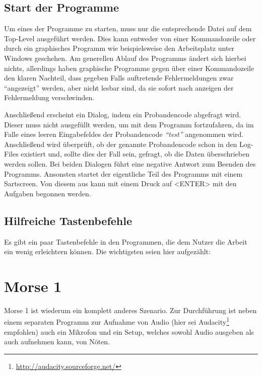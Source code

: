 \documentclass[a4paper]{scrartcl}
\newtheorem[M]{thmL}{Definition}
\begin{document}
\subsection{Start der Programme} \label{start}
Um eines der Programme zu starten, muss nur die entsprechende Datei auf dem Top-Level ausgeführt werden. Dies kann entweder von einer Kommandozeile oder durch ein graphisches Programm wie beispielsweise den Arbeitsplatz unter Windows geschehen. Am generellen Ablauf des Programms ändert sich hierbei nichts, allerdings haben graphische Programme gegen über einer Kommandozeile den klaren Nachteil, dass gegeben Falls auftretende Fehlermeldungen zwar "`angezeigt"' werden, aber nicht lesbar sind, da sie sofort nach anzeigen der Fehlermeldung verschwinden.

Anschließend erscheint ein Dialog, indem ein Probandencode abgefragt wird. Dieser muss nicht ausgefüllt werden, um mit dem Programm fortzufahren, da im Falle eines leeren Eingabefeldes der Probandencode \emph{"`test"'} angenommen wird. Anschließend wird überprüft, ob der genannte Probandencode schon in den Log-Files existiert und, sollte dies der Fall sein, gefragt, ob die Daten überschrieben werden sollen. Bei beiden Dialogen führt eine negative Antwort zum Beenden des Programms. Ansonsten startet der eigentliche Teil des Programms mit einem Sartscreen. Von diesem aus kann mit einem Druck auf <ENTER> mit den Aufgaben begonnen werden.

\subsection{Hilfreiche Tastenbefehle}
Es gibt ein paar Tastenbefehle in den Programmen, die dem Nutzer die Arbeit ein wenig erleichtern können. Die wichtigsten seien hier aufgezählt:

\section{Morse 1}
Morse 1 ist wiederum ein komplett anderes Szenario. Zur Durchführung ist neben einem separaten Programm zur Aufnahme von Audio (hier sei Audacity\footnote{\url{http://audacity.sourceforge.net/}} empfohlen) auch ein Mikrofon und ein Setup, welches sowohl Audio ausgeben als auch aufnehmen kann, von Nöten.
\end{document}
